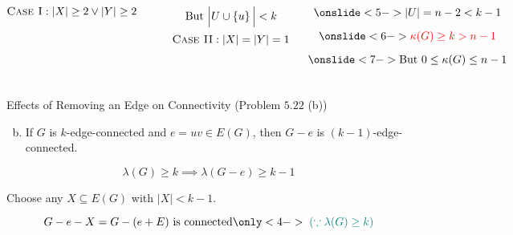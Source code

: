 \begin{frame}{}

  \begin{columns}
      \pause
      \[
	\textsc{Case I}: |X| \ge 2 \lor |Y| \ge 2
      \]

      \pause
      \begin{center}
      \end{center}
      \[
	\text{But } \Big\lvert U \cup \left\{u\right\} \Big \rvert < k
      \]
      \pause
      \[
	\textsc{Case II}: |X| = |Y| = 1
      \]

      \pause
      \vspace{-0.60cm}
      \begin{gather*}
	\onslide<5->{|U| = n - 2 < k - 1} \\[6pt]
	\onslide<6->{\red{\kappa(G) \ge k > n - 1}} \\[6pt]
	\onslide<7->{\text{But } 0 \le \kappa(G) \le n - 1}
      \end{gather*}
  \end{columns}
\end{frame}

\begin{frame}{}
  \begin{exampleblock}{Effects of Removing an Edge on Connectivity (Problem $5.22$\; (b))}
    \begin{enumerate}[(a)]
      \setcounter{enumi}{1}
      \item If $G$ is $k$-edge-connected and $e = uv \in E(G)$, then $G - e$ is $(k-1)$-edge-connected.
    \end{enumerate}
  \end{exampleblock}

  \[
    \lambda(G) \ge k \implies \lambda(G - e) \ge k-1
  \]

  \pause
  \vspace{0.50cm}
  \begin{center}
    Choose any $X \subseteq E(G)$ with $|X| < k - 1$. \\[6pt]
  \end{center}

  \pause
  \[
    G - e - X = G - (e + E) \text{ is connected} \only<4->{\;\teal{(\because \lambda(G) \ge k)}}
  \]
\end{frame}

